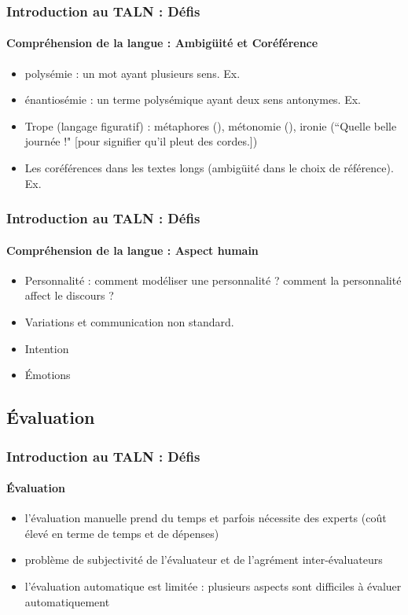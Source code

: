 \documentclass[xcolor=table]{beamer}
\begin{document}
\begin{frame}
\frametitle{Introduction au TALN : Défis}
\framesubtitle{Compréhension de la langue : Ambigüité et Coréférence}

\begin{itemize}
	\item polysémie : un mot ayant plusieurs sens. Ex. 
	\item énantiosémie : un terme polysémique ayant deux sens antonymes. Ex. 
	\item Trope (langage figuratif) : métaphores (), métonomie (), ironie (``Quelle belle journée !" [pour signifier qu'il pleut des cordes.])
	\item Les coréférences dans les textes longs (ambigüité dans le choix de référence). 
	Ex. 
\end{itemize}

\end{frame}

\begin{frame}
\frametitle{Introduction au TALN : Défis}
\framesubtitle{Compréhension de la langue : Aspect humain}

\begin{itemize}
	\item Personnalité : comment modéliser une personnalité ? comment la personnalité affect le discours ?
	\item Variations et communication non standard. 
	\item Intention 
	\item Émotions 
\end{itemize}

\end{frame}


\subsection{Évaluation}

\begin{frame}
\frametitle{Introduction au TALN : Défis}
\framesubtitle{Évaluation}

\begin{itemize}
	\item l'évaluation manuelle prend du temps et parfois nécessite des experts (coût élevé en terme de temps et de dépenses)
	\item problème de subjectivité de l'évaluateur et de l'agrément inter-évaluateurs
	\item l'évaluation automatique est limitée : plusieurs aspects sont difficiles à évaluer automatiquement
\end{itemize}

\end{frame}
\end{document}
